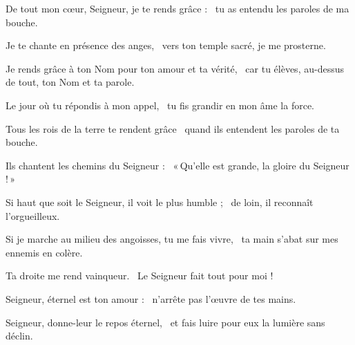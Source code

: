 \item De tout mon cœur, Seigneur, je te rends grâce :~\psstar{} tu as entendu les paroles de ma bouche.

\item Je te chante en présence des anges,~\psstar{} vers ton temple sacré, je me prosterne.

\item Je rends grâce à ton Nom pour ton amour et ta vérité,~\psstar{} car tu élèves, au-dessus de tout, ton Nom et ta parole.

\item Le jour où tu répondis à mon appel,~\psstar{} tu fis grandir en mon âme la force.

\item Tous les rois de la terre te rendent grâce~\psstar{} quand ils entendent les paroles de ta bouche.

\item Ils chantent les chemins du Seigneur :~\psstar{} «\,Qu'elle est grande, la gloire du Seigneur !\,»

\item Si haut que soit le Seigneur, il voit le plus humble ;~\psstar{} de loin, il reconnaît l'orgueilleux.

\item Si je marche au milieu des angoisses, tu me fais vivre,~\psstar{} ta main s'abat sur mes ennemis en colère.

\item Ta droite me rend vainqueur.~\psstar{} Le Seigneur fait tout pour moi !

\item Seigneur, éternel est ton amour :~\psstar{} n'arrête pas l'œuvre de tes mains.

\item Seigneur, donne-leur le repos éternel,~\psstar{} et fais luire pour eux la lumière sans déclin.